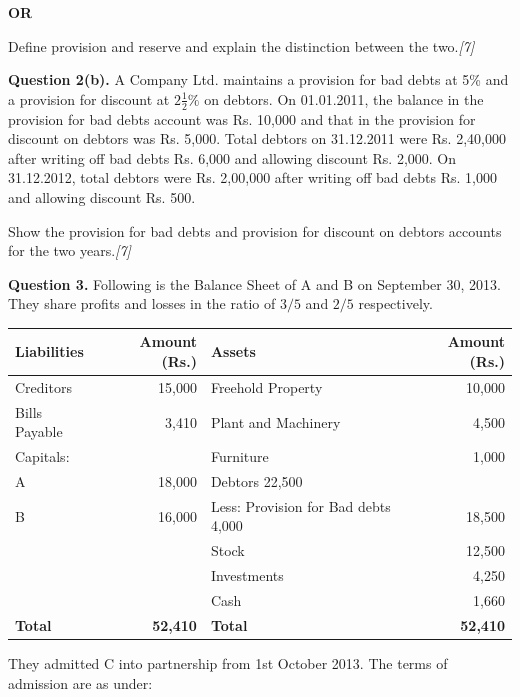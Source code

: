 \documentclass[11pt,a4paper]{article}
\newcommand{\pts}[1]{\hfill   \textit{[#1]}}
\begin{document}
\centerline{   \textbf{OR}}

Define provision and reserve and explain the distinction between the two.\pts{7}

\medskip



\noindent   \textbf{Question 2(b).}
A Company Ltd. maintains a provision for bad debts at 5\% and a provision for discount at $2\frac{1}{2}\%$ on debtors. On 01.01.2011, the balance in the provision for bad debts account was Rs. 10,000 and that in the provision for discount on debtors was Rs. 5,000. Total debtors on 31.12.2011 were Rs. 2,40,000 after writing off bad debts Rs. 6,000 and allowing discount Rs. 2,000. On 31.12.2012, total debtors were Rs. 2,00,000 after writing off bad debts Rs. 1,000 and allowing discount Rs. 500.

Show the provision for bad debts and provision for discount on debtors accounts for the two years.\pts{7}

\pagebreak




\noindent   \textbf{Question 3.}
Following is the Balance Sheet of A and B on September 30, 2013. They share profits and losses in the ratio of $3/5$ and $2/5$ respectively.


\begin{center}
\small

\begin{tabular}{|l|r||l|r|}
\hline
   \textbf{Liabilities} &   \textbf{Amount (Rs.)} &   \textbf{Assets} &   \textbf{Amount (Rs.)} \\
\hline
Creditors & 15,000 & Freehold Property & 10,000 \\
Bills Payable & 3,410 & Plant and Machinery & 4,500 \\
Capitals: & & Furniture & 1,000 \\
\quad A & 18,000 & Debtors \hfill 22,500 & \\
\quad B & 16,000 & Less: Provision for Bad debts \hfill 4,000 & 18,500 \\
& & Stock & 12,500 \\
& & Investments & 4,250 \\
& & Cash & 1,660 \\
\hline
   \textbf{Total} &   \textbf{52,410} &   \textbf{Total} &   \textbf{52,410} \\
\hline
\end{tabular}
\end{center}

They admitted C into partnership from 1st October 2013. The terms of admission are as under:
\end{document}
